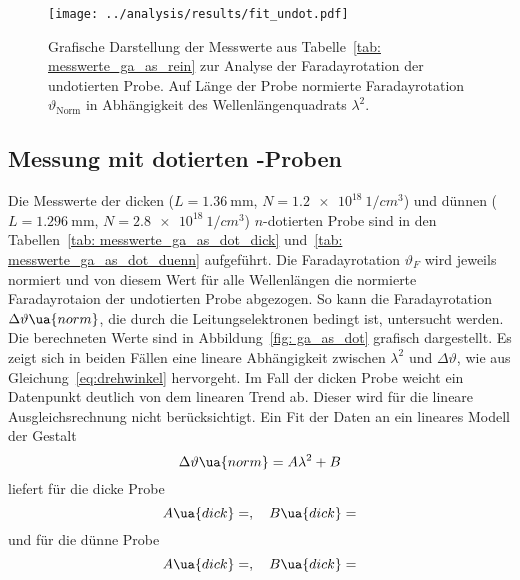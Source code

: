 

\begin{figure}
\centering
\texttt{[image: ../analysis/results/fit\_undot.pdf]}
\caption{Grafische Darstellung der Messwerte aus Tabelle~\ref{tab: messwerte_ga_as_rein} zur Analyse der 
Faradayrotation der undotierten Probe. Auf Länge der Probe normierte 
Faradayrotation $\vartheta_{\text{Norm}}$ in Abhängigkeit des Wellenlängenquadrats $\lambda^2$. }
\label{fig: ga_as_rein}
\end{figure}


\subsection{Messung mit dotierten -Proben}

Die Messwerte der dicken ($L = \SI{1.36}{\milli\meter}$, $N = \SI{1.2e18}{1/cm^3}$) und dünnen 
($L = \SI{1.296}{\milli\meter}$, $N = \SI{2.8e18}{1/cm^3}$) $n$-dotierten Probe sind in den 
Tabellen~\ref{tab: messwerte_ga_as_dot_dick} und~\ref{tab: messwerte_ga_as_dot_duenn} aufgeführt. Die Faradayrotation $\vartheta_F$ wird jeweils normiert und von diesem 
Wert für alle Wellenlängen die normierte Faradayrotaion der undotierten Probe abgezogen. So kann 
die Faradayrotation $\Delta \vartheta\ua{norm}$, die durch die Leitungselektronen bedingt ist, untersucht werden. Die berechneten Werte 
sind in Abbildung~\ref{fig: ga_as_dot} grafisch dargestellt. Es zeigt sich in beiden Fällen eine lineare Abhängigkeit zwischen $\lambda^2$
und $\Delta \vartheta$, wie aus Gleichung~\eqref{eq:drehwinkel} hervorgeht. Im Fall der dicken Probe weicht ein Datenpunkt deutlich 
von dem linearen Trend ab. Dieser wird für die lineare Ausgleichsrechnung nicht berücksichtigt. Ein Fit der Daten an 
ein lineares Modell der Gestalt 
\begin{equation}
    \Delta\vartheta\ua{norm} = A \lambda^2 + B
\end{equation}
liefert für die dicke Probe 
\begin{equation}
    A\ua{dick} = , 
    \quad B\ua{dick} = 
\end{equation}
und für die dünne Probe 
\begin{equation}
        A\ua{dick} = , 
    \quad B\ua{dick} = 
\end{equation}
